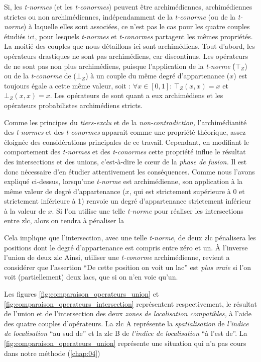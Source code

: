 Si, les \emph{t-normes} (et les \emph{t-conormes}) peuvent être
archimédiennes, archimédiennes strictes ou non archimédiennes,
indépendamment de la \emph{t-conorme} (ou de la \emph{t-norme}) à
laquelle elles sont associées, ce n'est pas le cas pour les quatre
couples étudiés ici, pour lesquels \emph{t-normes} et
\emph{t-conormes} partagent les mêmes propriétés. La moitié des
couples que nous détaillons ici sont archimédiens. Tout d'abord, les
opérateurs drastiques ne sont pas archimédiens, car discontinus. Les
opérateurs de \textcite{Zadeh1965} ne sont pas non plus archimédiens,
puisque l’application de la \emph{t-norme} (́\(⊤_Z\)) ou de la
\emph{t-conorme} de  (\(⊥_Z\)) à un couple du même degré
d'appartenance (\(x\)) est toujours égale a cette même valeur, soit :
\(∀ x ∈ [0,1]\): \(⊤_Z(x,x) = x\) et \(⊥_Z(x,x) = x\).
%
Les opérateurs de  sont quant a eux archimédiens et
les opérateurs probabilistes archimédiens stricts.

Comme les principes du \emph{tiers-exclu} et de la
\emph{non-contradiction,} l'archimédianité des \emph{t-normes} et des
\emph{t-conormes} apparait comme une propriété théorique, assez
éloignée des considérations principales de ce travail. Cependant, en
modifiant le comportement des \emph{t-normes} et des \emph{t-conormes}
cette propriété influe le résultat des intersections et des unions,
c'est-à-dire le cœur de la \emph{phase de fusion.} Il est donc
nécessaire d'en étudier attentivement les conséquences.
%
Comme nous l'avons expliqué ci-dessus,
lorsqu'une \emph{t-norme} est archimédienne, son application à la même
valeur de degré d’appartenance (\(x\), qui est strictement supérieure
à 0 et strictement inférieure à 1) renvoie un degré d’appartenance
strictement inférieur à la valeur de \(x\).
%
Si l'on utilise une telle \emph{t-norme} pour réaliser les
intersections entre \ac{zlc}, alors on tendra à pénaliser la


Cela
implique que l'intersection, avec une telle \emph{t-norme,} de deux
\ac{zlc} pénalisera les positions dont le degré d'appartenance est
compris entre zéro et un.
%
À l'inverse l'union de deux \ac{zlc} 
%
Ainsi, utiliser une \emph{t-conorme} archimédienne, revient a
considérer que l'assertion \enquote{De cette position on voit un lac}
est \emph{plus vraie} si l'on voit (partiellement) deux lacs, que si
on n'en voie qu'un.

Les figures \ref{fig:comparaison_operateurs_union} et
\ref{fig:comparaison_operateurs_intersection} représentent
respectivement, le résultat de l'union et de l'intersection des deux
\emph{zones de localisation compatibles,} à l'aide des quatre couples
d'opérateurs.
%
La \ac{zlc} \textcolor{RdBu-9-1}{\textsf{A}} représente
la \emph{spatialisation} de \emph{l'indice de localisation}
\enquote{au sud de} et la \ac{zlc} \textcolor{RdBu-9-9}{\textsf{B}} de
\emph{l'indice de localisation} \enquote{à l'est de}.
%
La \autoref{fig:comparaison_operateurs_union} représente une situation
qui n'a pas cours dans notre méthode (\autoref{chap:04})






